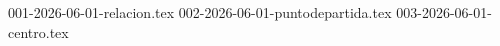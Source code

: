 \clearpage
{}

{001-2026-06-01-relacion.tex}
{002-2026-06-01-puntodepartida.tex}
{003-2026-06-01-centro.tex}
